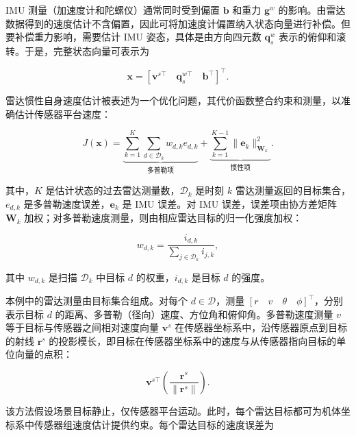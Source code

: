 IMU 测量（加速度计和陀螺仪）通常同时受到偏置 $\boldsymbol {b}$ 和重力 $\boldsymbol {g}^{w}$ 的影响。由雷达数据得到的速度估计不含偏置，因此可将加速度计偏置纳入状态向量进行补偿。但要补偿重力影响，需要估计 IMU 姿态，具体是由方向四元数 $\boldsymbol {q}_{s}^{w}$ 表示的俯仰和滚转。于是，完整状态向量可表示为

\begin{equation*}
\boldsymbol {x} = \left[ \boldsymbol {v}^{s\top} \quad \boldsymbol {q}_{s}^{w\top} \quad \boldsymbol {b}^{\top} \right] ^ {\top}.
\end{equation*}

雷达惯性自身速度估计被表述为一个优化问题，其代价函数整合约束和测量，以准确估计传感器平台速度：

\begin{equation}
J (\boldsymbol {x}) = \underbrace {\sum_ {k = 1} ^ {K} \sum_ {d \in \mathcal {D} _ {k}} w _ {d,k} e _ {d,k}} _ {\text {多普勒项}} + \underbrace {\sum_ {k = 1} ^ {K - 1} \| \boldsymbol {e} _ {k} \| _ {\boldsymbol {W} _ {k}} ^ {2}} _ {\text {惯性项}}.\tag{9.11}
\end{equation}

其中，$K$ 是估计状态的过去雷达测量数，$\mathcal {D}_{k}$ 是时刻 $k$ 雷达测量返回的目标集合，$e_{d,k}$ 是多普勒速度误差，$\boldsymbol {e}_{k}$ 是 IMU 误差。对 IMU 误差，误差项由协方差矩阵 $\boldsymbol {W}_{k}$ 加权；对多普勒速度测量，则由相应雷达目标的归一化强度加权：

\begin{equation}
w _ {d,k} = \frac {i _ {d,k}}{\sum _ {j \in \mathcal {D}_{k}} i _ {j,k}},\tag{9.12}
\end{equation}

其中 $w_{d,k}$ 是扫描 $\mathcal {D}_{k}$ 中目标 $d$ 的权重，$i_{d,k}$ 是目标 $d$ 的强度。

本例中的雷达测量由目标集合组成。对每个 $d \in \mathcal {D}$，测量 $[r\quad v\quad \theta\quad \phi]^{\top}$，分别表示目标 $d$ 的距离、多普勒（径向）速度、方位角和俯仰角。多普勒速度测量 $v$ 等于目标与传感器之间相对速度向量 $\boldsymbol {v}^{s}$ 在传感器坐标系中，沿传感器原点到目标的射线 $\boldsymbol {r}^{s}$ 的投影模长，即目标在传感器坐标系中的速度与从传感器指向目标的单位向量的点积：

\begin{equation}
\boldsymbol {v}^{s\top} \left(\frac {\boldsymbol {r}^{s}}{\|\boldsymbol {r}^{s}\|}\right).\tag{9.13}
\end{equation}

该方法假设场景目标静止，仅传感器平台运动。此时，每个雷达目标都可为机体坐标系中传感器组速度估计提供约束。每个雷达目标的速度误差为

